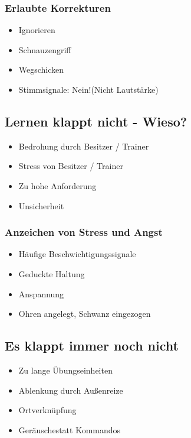         \subsubsection{Erlaubte Korrekturen}
            \begin{itemize}
                \item Ignorieren
                \item Schnauzengriff
                \item Wegschicken
                \item Stimmsignale: \glqq Nein!\grqq (Nicht Lautstärke)
            \end{itemize}

    \subsection{Lernen klappt nicht - Wieso?}
        \begin{itemize}
            \item Bedrohung durch Besitzer / Trainer
            \item Stress von Besitzer / Trainer
            \item Zu hohe Anforderung
            \item Unsicherheit
        \end{itemize}

        \subsubsection{Anzeichen von Stress und Angst}
            \begin{itemize}
                \item Häufige Beschwichtigungssignale
                \item Geduckte Haltung
                \item Anspannung
                \item Ohren angelegt, Schwanz eingezogen
            \end{itemize}

    \subsection{Es klappt immer noch nicht}
        \begin{itemize}
            \item Zu lange Übungseinheiten
            \item Ablenkung durch Außenreize
            \item Ortverknüpfung
            \item \glqq Geräusche\grqq statt Kommandos
        \end{itemize}

